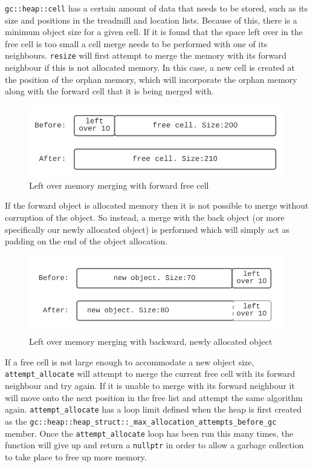\documentclass[11pt]{article}
\begin{document}
\texttt{gc::heap::cell} has a certain amount of data that needs to be stored, such as its size and positions in the treadmill
and location lists. Because of this, there is a minimum object size for a given cell. If it is found that the space left over in the free
cell is too small a cell  merge needs to be performed with one of its neighbours. \texttt{resize} will first attempt to 
merge the memory with its forward neighbour if this is not allocated memory. In this case, a new cell is created
at the position of the orphan memory, which will incorporate the orphan memory along with the forward cell
that it is being merged with.
\begin{figure}
\begin{center}
\includegraphics[scale=0.5]{./report_srcs/forward_merge.png}
\end{center}
\caption{Left over memory merging with forward free cell}
\label{fig:forwardmerge}
\end{figure}

If the forward object is allocated memory then it is not possible to merge without corruption of the object.
So instead, a merge with the back object (or more specifically our newly allocated object) is performed which will
simply act as padding on the end of the object allocation.

\begin{figure}
\begin{center}
\includegraphics[scale=0.5]{./report_srcs/backward_merge.png}
\end{center}
\caption{Left over memory merging with backward, newly allocated object}
\end{figure}

If a free cell is not large enough to accommodate a new object size, \texttt{attempt\_allocate} will
attempt to merge the current free cell with its forward neighbour and try again. If it is unable to merge
with its forward neighbour it will move onto the next position in the free list and attempt the same
algorithm again. \texttt{attempt\_allocate} has a loop limit defined when the heap is first created as the 
\texttt{gc::heap::heap\_struct::\_max\_allocation\_attempts\_before\_gc} member.
Once the \texttt{attempt\_allocate} loop has been run this many times, the function will give up and 
return a \texttt{nullptr} in order to allow a garbage collection to take place to free up more memory.
\end{document}
